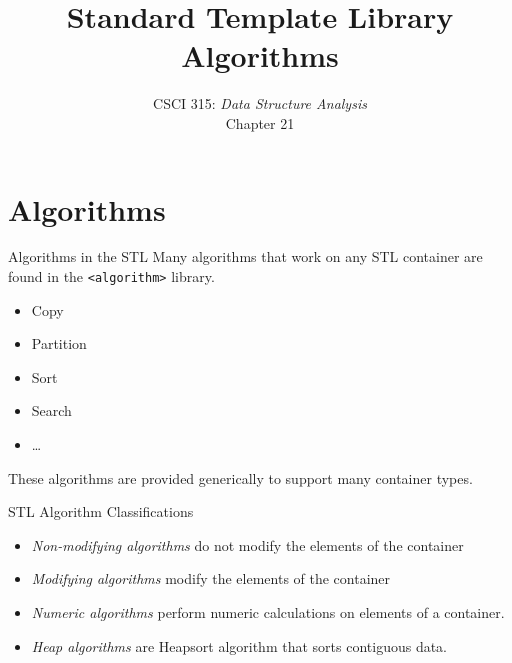\documentclass[14pt,aspectratio=1610]{beamer}
\title{\Huge{} Standard Template Library\\Algorithms}
\subtitle{CSCI 315: \textit{Data Structure Analysis}\\Chapter 21}
\institute{Charleston Southern University}
\begin{document}
\begin{frame}
  \titlepage{}
\end{frame}

\section*{Algorithms}

\begin{frame}{Algorithms in the STL}
Many algorithms that work on any STL container are \\
found in the \lstinline{<algorithm>} library.
\begin{itemize}
\item
  Copy
\item
  Partition
\item
  Sort
\item
  Search
\item
  \ldots{}
\end{itemize}

These algorithms are provided generically to support many container types.
\end{frame}


\begin{frame}{STL Algorithm Classifications}

\begin{itemize}
\item
  \emph{Non-modifying algorithms} do not modify the elements of the container
\item
  \emph{Modifying algorithms} modify the elements of the container
\item
  \emph{Numeric algorithms} perform numeric calculations on elements of a container.
\item
  \emph{Heap algorithms} are Heapsort algorithm that sorts contiguous data.
\end{itemize}
\end{frame}
\end{document}
